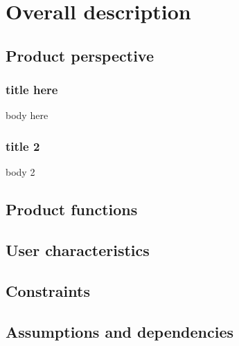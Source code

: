 
\section{Overall description}


\subsection{Product perspective}

\begin{frame} %
\frametitle{title here}
body here
\end{frame}

\begin{frame}
\frametitle{title 2}
body 2
\end{frame}


\subsection{Product functions}



\subsection{User characteristics}



\subsection{Constraints}



\subsection{Assumptions and dependencies}


